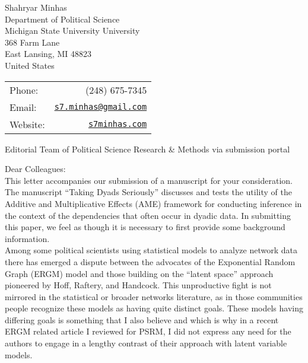 \documentclass[letterpaper]{article}
\begin{document}
\thispagestyle{empty}

\begin{minipage}{0.64\linewidth}
Shahryar Minhas \\
Department of Political Science \\
Michigan State University University \\
368 Farm Lane \\
East Lansing, MI 48823\\
United States
\end{minipage}
\begin{minipage}{0.45\linewidth}
  \begin{tabular}{lr}
    Phone: & (248) 675-7345 \\
    Email: & \href{mailto:s7.minhas@gmail.com}{\tt s7.minhas@gmail.com}  \\
    Website:& \href{http://s7minhas.com/}{\tt s7minhas.com}
  \end{tabular}
\end{minipage}

\vspace{.5in}

{Editorial Team of Political Science Research \& Methods via submission portal}

\vspace{0.25in}

Dear Colleagues:\\[1ex]

This letter accompanies our submission of a manuscript for your consideration. The manuscript ``Taking Dyads Seriously'' discusses and tests the utility of the Additive and Multiplicative Effects (AME) framework for conducting inference in the context of the dependencies that often occur in dyadic data. In submitting this paper, we feel as though it is necessary to first provide some background information. \\[1ex]

Among some political scientists using statistical models to analyze network data there has emerged a dispute between the advocates of the Exponential Random Graph (ERGM) model and those building on the ``latent space'' approach pioneered by Hoff, Raftery, and Handcock. This unproductive fight is not mirrored in the statistical or broader networks literature, as in those communities people recognize these models as having quite distinct goals. These models having differing goals is something that I also believe and which is why in a recent ERGM related article I reviewed for PSRM, I did not express any need for the authors to engage in a lengthy contrast of their approach with latent variable models. \\[1ex] 
\end{document}

